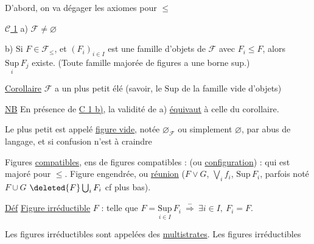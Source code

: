 
D'abord, on va dégager les axiomes pour $\leq$

\uline{$\mathcal C$ 1} a) $\mathcal F\ne\varnothing$

 b) Si $F\in\mathcal F_{\leq}$, et $(F_i)_{i\in I}$ est une famille d'objets de $\mathcal F$ avec $F_i\leq F$, alors $\underset{i}{\mathrm{Sup}}\,F_j$ existe. (Toute famille majorée de figures a une borne sup.)

\uline{Corollaire} $\mathcal F$ a un plus petit élé (savoir, le $\mathrm{Sup}$ de la famille vide d'objets)

\uline{NB} En présence de  \uline{C 1 b)}, la validité de a) \uline{équivaut} à celle du corollaire.

Le plus petit  est appelé \uline{figure vide}, notée $\varnothing_{\mathcal F}$ ou simplement $\varnothing$, par abus de langage, et si confusion n'est à craindre


Figures \uline{compatibles}, ens de figures  compatibles :   (ou \uline{configuration}) : qui est majoré pour $\leq$.  Figure engendrée, ou \uline{réunion} ($F\vee G$, $\bigvee_i f_i$, $\mathrm{Sup}\,F_i$, parfois noté $F\cup G$  $\deleted{F}\bigcup_iF_i$ cf plus bas).

\uline{Déf} \uline{Figure irréductible} $F$ : telle que $\displaystyle F=\underset{i\in I}{\mathrm{Sup}}\,F_i\ \overset{-}{\Longrightarrow}\ \exists i\in I,\ F_i=F$.

 Les figures irréductibles sont appelées des \uline{multistrates}.  Les figures irréductibles
